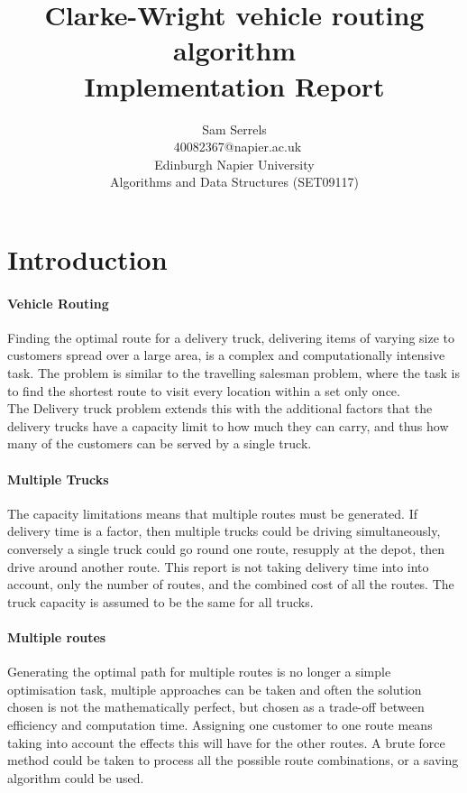\documentclass[conference]{acmsiggraph}
\title{Clarke-Wright vehicle routing algorithm\\
	   Implementation Report}
\author{Sam Serrels\\\ 40082367@napier.ac.uk \\
Edinburgh Napier University\\
Algorithms and Data Structures (SET09117)}
\begin{document}
\maketitle

\section{Introduction}

\paragraph{Vehicle Routing}
Finding the optimal route for a delivery truck, delivering items of varying size to customers spread over a large area, is a complex and computationally intensive task.
The problem is similar to the travelling salesman problem, where the task is to find the shortest route to visit every location within a set only once.\\
The Delivery truck problem extends this with the additional factors that the delivery trucks have a capacity limit to how much they can carry, and thus how many of the customers can be served by a single truck. 

\paragraph{Multiple Trucks}
The capacity limitations means that multiple routes must be generated. If delivery time is a factor, then multiple trucks could be driving simultaneously, conversely a single truck could go round one route, resupply at the depot, then drive around another route. This report is not taking delivery time into into account, only the number of routes, and the combined cost of all the routes. The truck capacity is assumed to be the same for all trucks.

\paragraph{Multiple routes}
Generating the optimal path for multiple routes is no longer a simple optimisation task, multiple approaches can be taken and often the solution chosen is not the mathematically perfect, but chosen as a trade-off between efficiency and computation time. Assigning one customer to one route means taking into account the effects this will have for the other routes. A brute force method could be taken to process all the possible route combinations, or a saving algorithm could be used.
\end{document}
